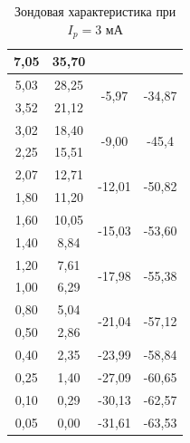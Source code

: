 \documentclass[a4paper,12pt]{article} %
\begin{document}
\begin{table}[h!]
\begin{tabular}{|cc|cc|}
		\multicolumn{1}{|c|}{7,05}    & 35,70     & \multicolumn{1}{c|}{}                        &                         \\ \hline
		\multicolumn{1}{|c|}{5,03}    & 28,25     & \multicolumn{1}{c|}{\multirow{2}{*}{-5,97}}  & \multirow{2}{*}{-34,87} \\ \cline{1-2}
		\multicolumn{1}{|c|}{3,52}    & 21,12     & \multicolumn{1}{c|}{}                        &                         \\ \hline
		\multicolumn{1}{|c|}{3,02}    & 18,40     & \multicolumn{1}{c|}{\multirow{2}{*}{-9,00}}  & \multirow{2}{*}{-45,4}  \\ \cline{1-2}
		\multicolumn{1}{|c|}{2,25}    & 15,51     & \multicolumn{1}{c|}{}                        &                         \\ \hline
		\multicolumn{1}{|c|}{2,07}    & 12,71     & \multicolumn{1}{c|}{\multirow{2}{*}{-12,01}} & \multirow{2}{*}{-50,82} \\ \cline{1-2}
		\multicolumn{1}{|c|}{1,80}    & 11,20     & \multicolumn{1}{c|}{}                        &                         \\ \hline
		\multicolumn{1}{|c|}{1,60}    & 10,05     & \multicolumn{1}{c|}{\multirow{2}{*}{-15,03}} & \multirow{2}{*}{-53,60} \\ \cline{1-2}
		\multicolumn{1}{|c|}{1,40}    & 8,84      & \multicolumn{1}{c|}{}                        &                         \\ \hline
		\multicolumn{1}{|c|}{1,20}    & 7,61      & \multicolumn{1}{c|}{\multirow{2}{*}{-17,98}} & \multirow{2}{*}{-55,38} \\ \cline{1-2}
		\multicolumn{1}{|c|}{1,00}    & 6,29      & \multicolumn{1}{c|}{}                        &                         \\ \hline
		\multicolumn{1}{|c|}{0,80}    & 5,04      & \multicolumn{1}{c|}{\multirow{2}{*}{-21,04}} & \multirow{2}{*}{-57,12} \\ \cline{1-2}
		\multicolumn{1}{|c|}{0,50}    & 2,86      & \multicolumn{1}{c|}{}                        &                         \\ \hline
		\multicolumn{1}{|c|}{0,40}    & 2,35      & \multicolumn{1}{c|}{-23,99}                  & -58,84                  \\ \hline
		\multicolumn{1}{|c|}{0,25}    & 1,40      & \multicolumn{1}{c|}{-27,09}                  & -60,65                  \\ \hline
		\multicolumn{1}{|c|}{0,10}    & 0,29      & \multicolumn{1}{c|}{-30,13}                  & -62,57                  \\ \hline
		\multicolumn{1}{|c|}{0,05}    & 0,00      & \multicolumn{1}{c|}{-31,61}                  & -63,53                  \\ \hline
	\end{tabular}
	\caption{Зондовая характеристика при $I_p = 3$ мА}
\end{table}
\end{document}
